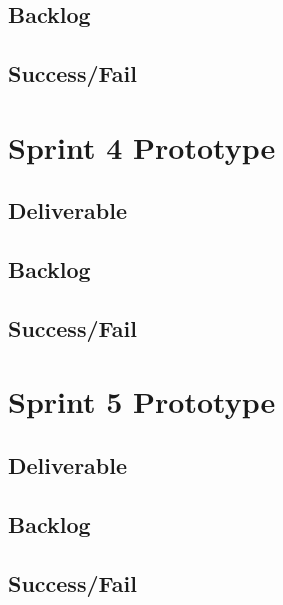 \subsection{Backlog}
\subsection{Success/Fail}

\section{Sprint 4 Prototype}
\subsection{Deliverable}
\subsection{Backlog}
\subsection{Success/Fail}

\section{Sprint 5 Prototype}
\subsection{Deliverable}
\subsection{Backlog}
\subsection{Success/Fail}

